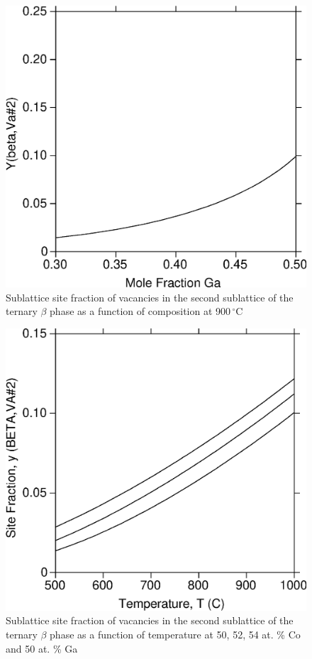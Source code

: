 \documentclass[article]{elsarticle}
\begin{document}
\begin{figure}
\centering
\includegraphics[scale=0.45]{sf_comp_CoNiGa}
\caption{Sublattice site fraction of vacancies in the second sublattice of the
ternary $\beta$ phase as a function of composition at 900$\,^{\circ}\mathrm{C}$}
\label{sf-comp_CoNiGa}
\end{figure}
\begin{figure}
\centering
\includegraphics[scale=0.45]{sf_temp_CoNiGa}
\caption{Sublattice site fraction of vacancies in the second sublattice of the
ternary $\beta$ phase as a function of temperature  at 50, 52, 54 at. \% Co and 50 at. \% Ga} 
\label{sf-temp_CoNiGa}
\end{figure}
\end{document}
